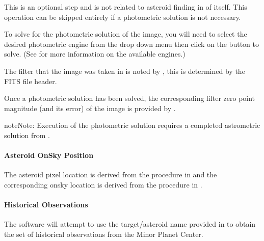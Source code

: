 \documentclass[letterpaper,11pt,english]{sphinxmanual}
\begin{document}
\sphinxAtStartPar
This is an optional step and is not related to asteroid finding in of itself.
This operation can be skipped entirely if a photometric solution is not
necessary.

\sphinxAtStartPar
To solve for the photometric solution of the image, you will need to select
the desired photometric engine from the drop down menu then click on the
 button to solve.
(See {\hyperref[\detokenize{technical/architecture/services_engines:technical-architecture-services-engines}]{}} for more information on
the available engines.)

\sphinxAtStartPar
The filter that the image was taken in is noted by , this is
determined by the FITS file header.

\sphinxAtStartPar
Once a photometric solution has been solved, the corresponding filter zero
point magnitude (and its error) of the image is provided by
.

\begin{sphinxadmonition}{note}{Note:}
\sphinxAtStartPar
Execution of the photometric solution requires a completed astrometric
solution from
{\hyperref[\detokenize{user/manual_mode:user-manual-mode-procedure-find-asteroid-location-compute-astrometric-solution}]{}}.
\end{sphinxadmonition}


\paragraph{Asteroid On\sphinxhyphen{}Sky Position}
\label{\detokenize{user/manual_mode:asteroid-on-sky-position}}\label{\detokenize{user/manual_mode:user-manual-mode-procedure-asteroid-on-sky-position}}
\sphinxAtStartPar
The asteroid pixel location is derived from the procedure in
{\hyperref[\detokenize{user/manual_mode:user-manual-mode-procedure-find-asteroid-location-target-selector-gui}]{}}
and the corresponding on\sphinxhyphen{}sky location is derived from the procedure in
{\hyperref[\detokenize{user/manual_mode:user-manual-mode-procedure-find-asteroid-location-compute-astrometric-solution}]{}}.


\paragraph{Historical Observations}
\label{\detokenize{user/manual_mode:historical-observations}}\label{\detokenize{user/manual_mode:user-manual-mode-procedure-historical-observations}}
\sphinxAtStartPar
The software will attempt to use the target/asteroid name provided in
{\hyperref[\detokenize{user/manual_mode:user-manual-mode-procedure-specify-new-target-name}]{}}
to obtain the set of historical observations from the Minor Planet Center.
\end{document}
